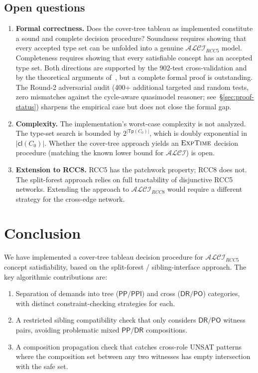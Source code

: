 \documentclass[a4paper,11pt]{article}
\theoremstyle{definition}
\newcommand{\ALCI}{\ensuremath{\mathcal{ALCI}}}
\newcommand{\ALCIRCC}[1]{\ensuremath{\mathcal{ALCI}_{\mathit{RCC#1}}}}
\newcommand{\DR}{\ensuremath{\mathsf{DR}}}
\newcommand{\PO}{\ensuremath{\mathsf{PO}}}
\newcommand{\PP}{\ensuremath{\mathsf{PP}}}
\newcommand{\PPI}{\ensuremath{\mathsf{PPI}}}
\newcommand{\cl}{\ensuremath{\mathsf{cl}}}
\newcommand{\Tp}{\ensuremath{\mathsf{Tp}}}
\newcommand{\EXPTIME}{\textsc{ExpTime}}
\begin{document}
\subsection{Open questions}

\begin{enumerate}[label=(\arabic*)]
  \item \textbf{Formal correctness.}
    Does the cover-tree tableau as implemented constitute a sound
    and complete decision procedure?  Soundness requires showing
    that every accepted type set can be unfolded into a genuine
    $\ALCIRCC{5}$ model.  Completeness requires showing that every
    satisfiable concept has an accepted type set.  Both directions
    are supported by the 902-test cross-validation and by the
    theoretical arguments of~\cite{SiblingCompleted}, but a
    complete formal proof is outstanding.
    The Round-2 adversarial audit (400+ additional targeted and
    random tests, zero mismatches against the cycle-aware
    quasimodel reasoner; see~\S\ref{sec:proof-status}) sharpens the
    empirical case but does not close the formal gap.

  \item \textbf{Complexity.}
    The implementation's worst-case complexity is not analyzed.
    The type-set search is bounded by $2^{|\Tp(C_0)|}$, which
    is doubly exponential in $|\cl(C_0)|$.  Whether the
    cover-tree approach yields an $\EXPTIME$ decision procedure
    (matching the known lower bound for $\ALCI$) is open.

  \item \textbf{Extension to RCC8.}
    RCC5 has the patchwork property; RCC8 does not.  The
    split-forest approach relies on full tractability of
    disjunctive RCC5 networks.  Extending the approach to
    $\ALCIRCC{8}$ would require a different strategy for the
    cross-edge network.
\end{enumerate}


\section{Conclusion}
\label{sec:conclusion}

We have implemented a cover-tree tableau decision procedure for
$\ALCIRCC{5}$ concept satisfiability, based on the split-forest /
sibling-interface approach.  The key algorithmic contributions are:
\begin{enumerate}[nosep]
  \item Separation of demands into tree ($\PP/\PPI$) and cross
    ($\DR/\PO$) categories, with distinct constraint-checking
    strategies for each.
  \item A restricted sibling compatibility check that only
    considers $\DR/\PO$ witness pairs, avoiding problematic
    mixed $\PP/\DR$ compositions.
  \item A composition propagation check that catches
    cross-role UNSAT patterns where the composition set between
    any two witnesses has empty intersection with the safe set.
\end{enumerate}
\end{document}
